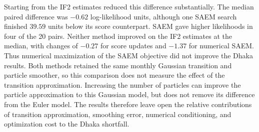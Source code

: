\documentclass[11pt]{article}
\theoremstyle{thmstylethree}%
\begin{document}
Starting from the IF2 estimates reduced this difference substantially.
The median paired difference was $-0.62$ log-likelihood units, although
one SAEM search finished $39.59$ units below its score counterpart.
SAEM gave higher likelihoods in four of the 20 pairs.
Neither method improved on the IF2 estimates at the median, with changes
of $-0.27$ for score updates and $-1.37$ for numerical SAEM.
Thus numerical maximization of the SAEM objective did not improve the
Dhaka results.
Both methods retained the same monthly Gaussian transition and particle
smoother, so this comparison does not measure the effect of the transition
approximation. Increasing the number of particles can improve the
particle approximation to this Gaussian model, but does not remove its
difference from the Euler model. The results therefore leave open the
relative contributions of transition approximation, smoothing error,
numerical conditioning, and optimization cost to the Dhaka shortfall.

\clearpage



\clearpage

\end{document}
